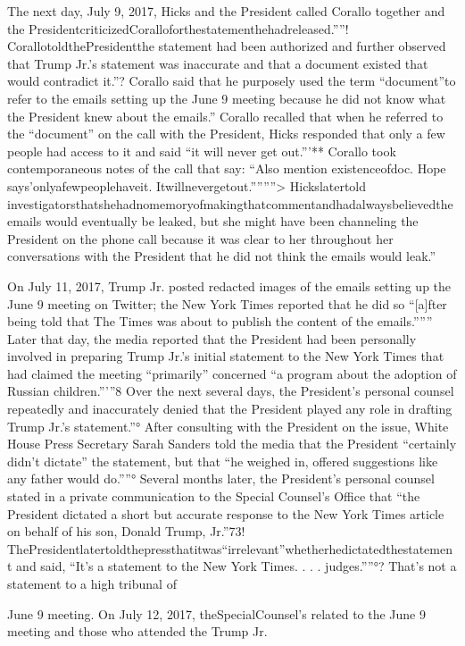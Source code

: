 The next day, July 9, 2017, Hicks and the President called Corallo together and the PresidentcriticizedCoralloforthestatementhehadreleased.””!
CorallotoldthePresidentthe statement had been authorized and further observed that Trump Jr.'s statement was inaccurate and that a document existed that would contradict it.”?
Corallo said that he purposely used the term “document”to refer to the emails setting up the June 9 meeting because he did not know what the President knew about the emails.”
Corallo recalled that when he referred to the “document” on the call with the President, Hicks responded that only a few people had access to it and said “it will never get out.”'**
Corallo took contemporaneous notes of the call that say: “Also mention existenceofdoc.
Hope says'onlyafewpeoplehaveit.
Itwillnevergetout.””””>
Hickslatertold investigatorsthatshehadnomemoryofmakingthatcommentandhadalwaysbelievedtheemails would eventually be leaked, but she might have been channeling the President on the phone call because it was clear to her throughout her conversations with the President that he did not think the emails would leak.”

On July 11, 2017, Trump Jr. posted redacted images of the emails setting up the June 9 meeting on Twitter; the New York Times reported that he did so “[a]fter being told that The Times was about to publish the content of the emails.”””
Later that day, the media reported that the President had been personally involved in preparing Trump Jr.'s initial statement to the New York Times that had claimed the meeting “primarily” concerned “a program about the adoption of Russian children.”'”8
Over the next several days, the President's personal counsel repeatedly and inaccurately denied that the President played any role in drafting Trump Jr.'s statement.”°
After consulting with the President on the issue, White House Press Secretary Sarah Sanders told the media that the President “certainly didn't dictate” the statement, but that “he weighed in, offered suggestions like any father would do.””°
Several months later, the President's personal counsel stated in a private communication to the Special Counsel's Office that “the President dictated a short but accurate response to the New York Times article on behalf of his son, Donald Trump,
Jr.”73!
ThePresidentlatertoldthepressthatitwas“irrelevant”whetherhedictatedthestatement
and said, “It's a statement to the New York Times. . . . judges.””°?
That's not a statement to a high tribunal of

June 9 meeting.
On July 12, 2017, theSpecialCounsel's
related to the June 9 meeting and those who attended the
Trump Jr.

